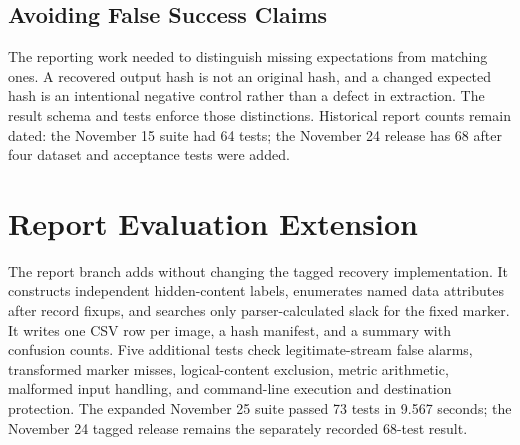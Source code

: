 \subsection{Avoiding False Success Claims}
The reporting work needed to distinguish missing expectations from matching
ones. A recovered output hash is not an original hash, and a changed expected
hash is an intentional negative control rather than a defect in extraction.
The result schema and tests enforce those distinctions. Historical report
counts remain dated: the November 15 suite had 64 tests; the November 24
release has 68 after four dataset and acceptance tests were added.

\section{Report Evaluation Extension}
The report branch adds  without
changing the tagged recovery implementation. It constructs independent
hidden-content labels, enumerates named data attributes after record fixups,
and searches only parser-calculated slack for the fixed marker. It writes
one CSV row per image, a hash manifest, and a summary with confusion counts.
Five additional tests check legitimate-stream false alarms, transformed
marker misses, logical-content exclusion, metric arithmetic, malformed input
handling, and command-line execution and destination protection. The expanded
November 25 suite passed 73 tests in 9.567 seconds; the November 24 tagged
release remains the separately recorded 68-test result.
